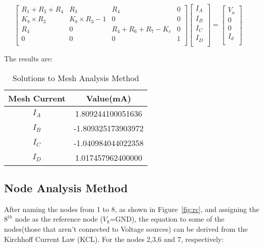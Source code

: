 $$
\begin{bmatrix}
R_1+R_3+R_4       &   R_3       & R_4     &   0       \\
K_b \times R_3       &   K_b \times R_3-1       & 0    &   0      \\
R_4  &  0  &   R_4+R_6+R_7-K_c  &   0 \\
0       &   0      & 0    &   1      \\
\end{bmatrix}
\begin{bmatrix}
I_A     \\
I_B    \\
I_C   \\
I_D     \\
\end{bmatrix}
=
\begin{bmatrix}
V_a   \\
0    \\
0  \\
I_d   \\
\end{bmatrix}
\quad
$$


The results are:

\begin{table}[h]


\label{tab:tables}
\begin{center}
\begin{tabular}{|c|c|}
 \hline
  Mesh Current & Value\hspace{1mm}(mA)\\
 \hline
 $I_{A}$ & 1.809244100051636 \\
 \hline
 $I_{B}$ &-1.809325173903972\\
 \hline
 $I_{C}$ &-1.040984044022358\\
 \hline
 $I_{D}$ &1.017457962400000\\
 \hline
\end{tabular}
\caption{Solutions to Mesh Analysis Method}
\label{table:tab2}
\end{center}
\end{table}

\subsection{Node Analysis Method}

After naming the nodes from 1 to 8, as shown in Figure~\ref{fig:rc}, and assigning the $8^{th}$ node as the reference node ($V_{8}$=GND), the equation to some of the nodes(those that aren't connected to Voltage sources) can be derived from the  Kirchhoff Current Law (KCL).
For the nodes 2,3,6 and 7, respectively:

